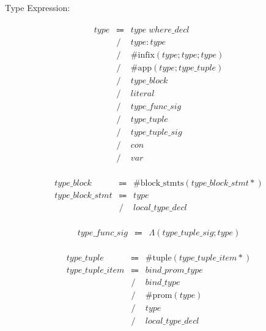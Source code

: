 Type Expression:

\begin{align*}
    \begin{array}{rcll}
        \mathit{type}
        &\Coloneq &\mathit{type}\; \mathit{where\_decl} \\
        &\mathrel{/} &\mathit{type}: \mathit{type} \\
        &\mathrel{/} &\mathrm{\#infix}(\mathit{type}; \mathit{type}; \mathit{type}) \\
        &\mathrel{/} &\mathrm{\#app}(\mathit{type}; \mathit{type\_tuple}) \\
        &\mathrel{/} &\mathit{type\_block} \\
        &\mathrel{/} &\mathit{literal} \\
        &\mathrel{/} &\mathit{type\_func\_sig} \\
        &\mathrel{/} &\mathit{type\_tuple} \\
        &\mathrel{/} &\mathit{type\_tuple\_sig} \\
        &\mathrel{/} &\mathit{con} \\
        &\mathrel{/} &\mathit{var}
    \end{array}
\end{align*}

\begin{align*}
    \begin{array}{rcll}
        \mathit{type\_block}
        &\Coloneq &\mathrm{\#block\_stmts}(\mathit{type\_block\_stmt}{*}) \\
        \mathit{type\_block\_stmt}
        &\Coloneq &\mathit{type} \\
        &\mathrel{/} &\mathit{local\_type\_decl}
    \end{array}
\end{align*}

\begin{align*}
    \begin{array}{rcll}
        \mathit{type\_func\_sig}
        &\Coloneq &\Lambda(\mathit{type\_tuple\_sig}; \mathit{type})
    \end{array}
\end{align*}

\begin{align*}
    \begin{array}{rcll}
        \mathit{type\_tuple}
        &\Coloneq &\mathrm{\#tuple}(\mathit{type\_tuple\_item}{*}) \\
        \mathit{type\_tuple\_item}
        &\Coloneq &\mathit{bind\_prom\_type} \\
        &\mathrel{/} &\mathit{bind\_type} \\
        &\mathrel{/} &\mathrm{\#prom}(\mathit{type}) \\
        &\mathrel{/} &\mathit{type} \\
        &\mathrel{/} &\mathit{local\_type\_decl}
    \end{array}
\end{align*}

